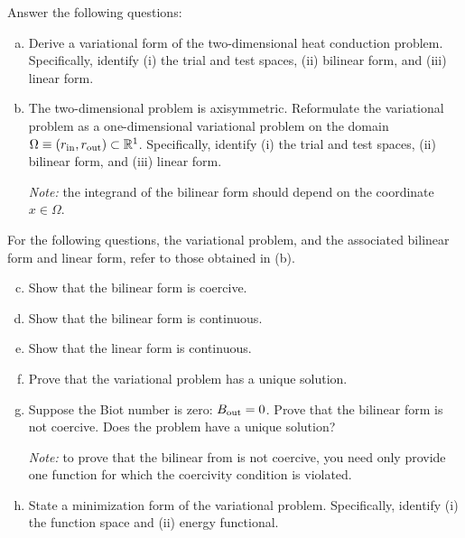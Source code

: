 \documentclass[preprint,11pt]{article}
\begin{document}
Answer the following questions:
\begin{enumerate}[(a)]
\item Derive a variational form of the two-dimensional heat conduction problem.  Specifically, identify (i) the trial and test spaces, (ii) bilinear form, and (iii) linear form.
\item The two-dimensional problem is axisymmetric. Reformulate the variational problem as a one-dimensional variational problem on the domain $\Omega \equiv (r_{\rm in}, r_{\rm out}) \subset \mathbb{R}^1$.  Specifically, identify (i) the trial and test spaces, (ii) bilinear form, and (iii) linear form.

  \emph{Note:} the integrand of the bilinear form should depend on the coordinate $x \in \Omega$.
\end{enumerate}
For the following questions, the variational problem, and the associated bilinear form and linear form, refer to those obtained in (b).
\begin{enumerate}[(a)]
  \setcounter{enumi}{2}
\item Show that the bilinear form is coercive.
\item Show that the bilinear form is continuous.
\item Show that the linear form is continuous.
\item Prove that the variational problem has a unique solution.
\item Suppose the Biot number is zero: $B_{\rm out} = 0$.  Prove that the bilinear form is not coercive.  Does the problem have a unique solution?

  \emph{Note:} to prove that the bilinear from is not coercive, you need only provide one function for which the coercivity condition is violated.
\item State a minimization form of the variational problem.  Specifically, identify (i) the function space and (ii) energy functional.
\end{enumerate}
\end{document}
